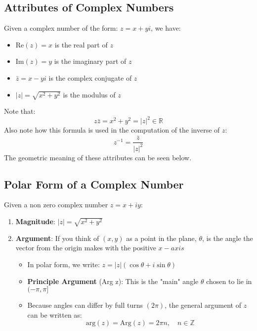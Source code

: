 \documentclass[12pt]{article}
\theoremstyle{definition}
\theoremstyle{plain}
\begin{document}
\subsection{Attributes of Complex Numbers}
Given a complex number of the form: $z = x + yi$, we have:
\begin{itemize}
  \item Re$(z) = x$ is the real part of $z$ \
  \item Im$(z) = y$ is the imaginary part of $z$ 
  \item $\bar{z} = x - yi$ is the complex conjugate of $z$
  \item $|z| = \sqrt{x^2 + y^2}$ is the modulus of $z$
\end{itemize}
Note that: 
\[
z\bar{z} = x^2 + y^2 = |z|^2 \in \mathbb{R}
\]
Also note how this formula is used in the computation of the inverse of $z$:
\[
z^{-1} = \frac{\overline{z}}{|z|^2}
\]
The geometric meaning of these attributes can be seen below.
  \begin{center}

\end{center}

\pagebreak 

\subsection{Polar Form of a Complex Number}
Given a non zero complex number $z = x + iy$:
\begin{enumerate}
  \item \textbf{Magnitude}: $\mid z \mid = \sqrt{x^2 + y^2}$
  \item \textbf{Argument}: If you think of $(x,y)$ as a point in the plane, $\theta$, is the angle the vector from the origin makes with the positive $x-axis$
  \begin{itemize}
    \item In polar form, we write: $z = |z|(\cos\theta + i\sin\theta)$
    \item \textbf{Principle Argument} (Arg z): This is the "main" angle $\theta$ chosen to lie in $(-\pi, \pi]$
    \item Because angles can differ by full turns $(2\pi)$, the general argument of $z$ can be written as: $$\text{arg}(z) = \text{Arg}(z) = 2\pi n, \quad n \in \mathbb{Z}$$
  \end{itemize}
\end{enumerate}
\end{document}

